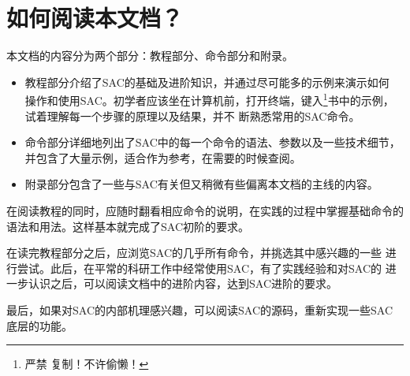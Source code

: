 \section{如何阅读本文档？}
本文档的内容分为两个部分：教程部分、命令部分和附录。

\begin{itemize}
\item 教程部分介绍了SAC的基础及进阶知识，并通过尽可能多的示例来演示如何
    操作和使用SAC。初学者应该坐在计算机前，打开终端，键入\footnote{严禁
    复制！不许偷懒！}书中的示例，试着理解每一个步骤的原理以及结果，并不
    断熟悉常用的SAC命令。
\item 命令部分详细地列出了SAC中的每一个命令的语法、参数以及一些技术细节，
    并包含了大量示例，适合作为参考，在需要的时候查阅。
\item 附录部分包含了一些与SAC有关但又稍微有些偏离本文档的主线的内容。
\end{itemize}

在阅读教程的同时，应随时翻看相应命令的说明，在实践的过程中掌握基础命令的
语法和用法。这样基本就完成了SAC初阶的要求。

在读完教程部分之后，应浏览SAC的几乎所有命令，并挑选其中感兴趣的一些
进行尝试。此后，在平常的科研工作中经常使用SAC，有了实践经验和对SAC的
进一步认识之后，可以阅读文档中的进阶内容，达到SAC进阶的要求。

最后，如果对SAC的内部机理感兴趣，可以阅读SAC的源码，重新实现一些SAC
底层的功能。
